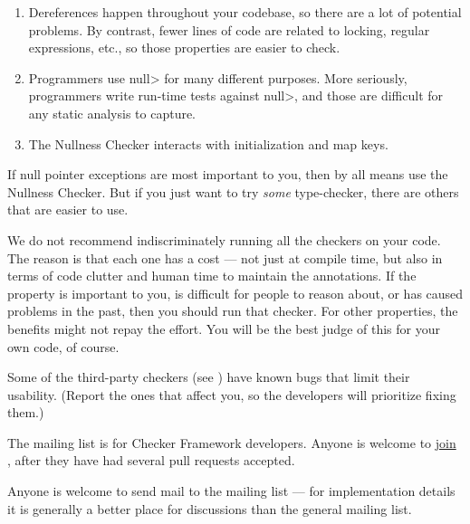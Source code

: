 \begin{enumerate}
\item
  Dereferences happen throughout your codebase, so there are a lot of
  potential problems.  By contrast, fewer lines of code are related to
  locking, regular expressions, etc., so those properties are easier to
  check.
\item
  Programmers use \<null> for many different purposes.  More seriously,
  programmers write run-time tests against \<null>, and those are difficult
  for any static analysis to capture.
\item
  The Nullness Checker interacts with initialization and map keys.
\end{enumerate}

If null pointer exceptions are most important to you, then by all means use
the Nullness Checker.  But if you just want to try \emph{some}
type-checker, there are others that are easier to use.

We do not recommend indiscriminately running all the checkers on your code.
The reason is that each one has a cost --- not just at compile time, but
also in terms of code clutter and human time to maintain the annotations.
If the property is important to you, is difficult for people to reason
about, or has caused problems in the past, then you should run that
checker.  For other properties, the benefits might not repay the effort.  You will be the best judge of this for your own code, of course.

Some of the third-party checkers (see
)
have known bugs that limit their
usability.  (Report the ones that affect you, so the developers
will prioritize fixing them.)



The  mailing list is for
Checker Framework developers.  Anyone is welcome to
\href{https://groups.google.com/forum/#!forum/checker-framework-dev}{join
  }, after they have had several pull requests
accepted.

Anyone is welcome to send mail to the
 mailing list --- for
implementation details it is generally a better place for discussions than
the general  mailing list.

